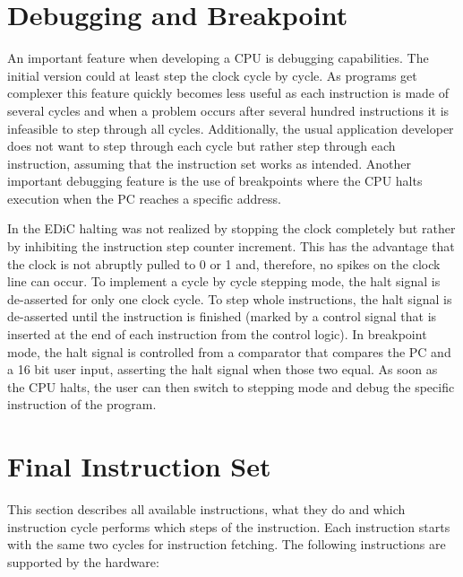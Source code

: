 \section{Debugging and Breakpoint}
An important feature when developing a \gls{CPU} is debugging capabilities.
The initial version could at least step the clock cycle by cycle.
As programs get complexer this feature quickly becomes less useful as each instruction is made of several cycles and when a problem occurs after several hundred instructions it is infeasible to step through all cycles.
Additionally, the usual application developer does not want to step through each cycle but rather step through each instruction, assuming that the instruction set works as intended.
Another important debugging feature is the use of breakpoints where the \gls{CPU} halts execution when the \gls{PC} reaches a specific address.

In the \gls{EDiC} halting was not realized by stopping the clock completely but rather by inhibiting the instruction step counter increment.
This has the advantage that the clock is not abruptly pulled to 0 or 1 and, therefore, no spikes on the clock line can occur.
To implement a cycle by cycle stepping mode, the halt signal is de-asserted for only one clock cycle.
To step whole instructions, the halt signal is de-asserted until the instruction is finished (marked by a control signal that is inserted at the end of each instruction from the control logic).
In breakpoint mode, the halt signal is controlled from a comparator that compares the \gls{PC} and a 16 bit user input, asserting the halt signal when those two equal.
As soon as the \gls{CPU} halts, the user can then switch to stepping mode and debug the specific instruction of the program.

\section{Final Instruction Set}\label{sec:instructionSet}
This section describes all available instructions, what they do and which instruction cycle performs which steps of the instruction.
Each instruction starts with the same two cycles for instruction fetching.
The following instructions are supported by the hardware:
